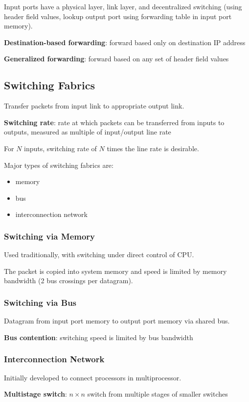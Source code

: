 \documentclass[11pt]{article}
\begin{document}
Input ports have a physical layer, link layer, and decentralized switching (using header
field values, lookup output port using forwarding table in input port memory).

\textbf{Destination-based forwarding}: forward based only on destination IP address

\textbf{Generalized forwarding}: forward based on any set of header field values
\subsection{Switching Fabrics}
\label{sec:org79ce811}
Transfer packets from input link to appropriate output link.

\textbf{Switching rate}: rate at which packets can be transferred from inputs to outputs,
measured as multiple of input/output line rate

For \(N\) inputs, switching rate of \(N\) times the line rate is desirable.

Major types of switching fabrics are:
\begin{itemize}
\item memory
\item bus
\item interconnection network
\end{itemize}
\subsubsection{Switching via Memory}
\label{sec:org84b0bc8}
Used traditionally, with switching under direct control of CPU.

The packet is copied into system memory and speed is limited by memory bandwidth
(2 bus crossings per datagram).
\subsubsection{Switching via Bus}
\label{sec:orge2563a2}
Datagram from input port memory to output port memory via shared bus.

\textbf{Bus contention}: switching speed is limited by bus bandwidth
\subsubsection{Interconnection Network}
\label{sec:org12d4619}
Initially developed to connect processors in multiprocessor.

\textbf{Multistage switch}: \(n \times n\) switch from multiple stages of smaller switches
\end{document}
